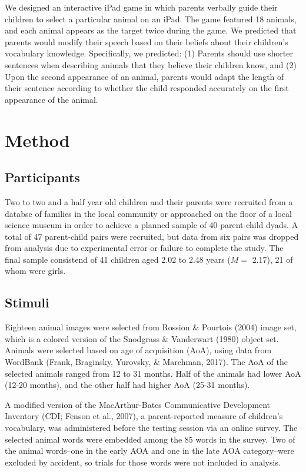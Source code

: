 \documentclass[10pt, letterpaper]{article}
\begin{document}
We designed an interactive iPad game in which parents verbally guide
their children to select a particular animal on an iPad. The game
featured 18 animals, and each animal appears as the target twice during
the game. We predicted that parents would modify their speech based on
their beliefs about their children's vocabulary knowledge. Specifically,
we predicted: (1) Parents should use shorter sentences when describing
animals that they believe their children know, and (2) Upon the second
appearance of an animal, parents would adapt the length of their
sentence according to whether the child responded accurately on the
first appearance of the animal.

\hypertarget{method}{%
\section{Method}\label{method}}

\hypertarget{participants}{%
\subsection{Participants}\label{participants}}

Two to two and a half year old children and their parents were recruited
from a databse of families in the local community or approached on the
floor of a local science museum in order to achieve a planned sample of
40 parent-child dyads. A total of 47 parent-child pairs were recruited,
but data from six pairs was dropped from analysis due to experimental
error or failure to complete the study. The final sample consistend of
41 children aged 2.02 to 2.48 years (\(M =\) 2.17), 21 of whom were
girls.

\hypertarget{stimuli}{%
\subsection{Stimuli}\label{stimuli}}

Eighteen animal images were selected from Rossion \& Pourtois (2004)
image set, which is a colored version of the Snodgrass \& Vanderwart
(1980) object set. Animals were selected based on age of acquisition
(AoA), using data from WordBank (Frank, Braginsky, Yurovsky, \&
Marchman, 2017). The AoA of the selected animals ranged from 12 to 31
months. Half of the animals had lower AoA (12-20 months), and the other
half had higher AoA (25-31 months).

A modified version of the MacArthur-Bates Communicative Development
Inventory (CDI; Fenson et al., 2007), a parent-reported measure of
children's vocabulary, was administered before the testing session via
an online survey. The selected animal words were embedded among the 85
words in the survey. Two of the animal words--one in the early AOA and
one in the late AOA category--were excluded by accident, so trials for
those words were not included in analysis.
\end{document}

